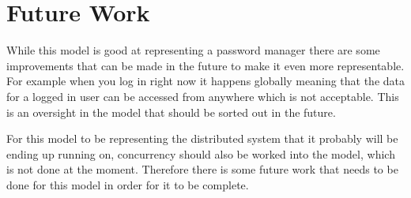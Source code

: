 \chapter{Future Work} \label{chapt:future}

While this model is good at representing a password manager there are some
improvements that can be made in the future to make it even more representable.
For example when you log in right now it happens globally meaning that the data
for a logged in user can be accessed from anywhere which is not acceptable.
This is an oversight in the model that should be sorted out in the future.

For this model to be representing the distributed system that it probably will
be ending up running on, concurrency should also be worked into the model,
which is not done at the moment. Therefore there is some future work that needs
to be done for this model in order for it to be complete.